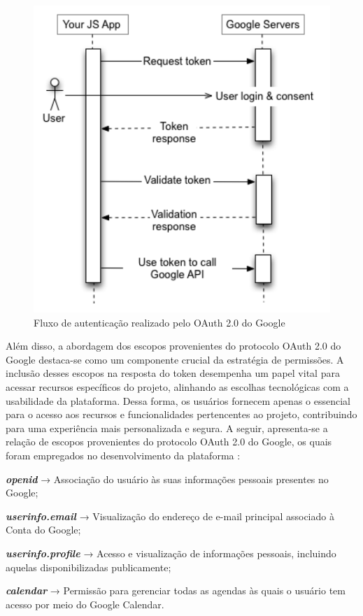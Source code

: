 \begin{figure}[!h] %
    \centering
    \includegraphics[scale=0.5]{latex/figuras/oauth.pdf}
    \caption[A implementação da autenticação OAuth 2.0]
    {Fluxo de autenticação realizado pelo OAuth 2.0 do Google}
\end{figure}

\pagebreak Além disso, a abordagem dos escopos provenientes do protocolo OAuth 2.0 do Google destaca-se como um componente crucial da estratégia de permissões. A inclusão desses escopos na resposta do token desempenha um papel vital para acessar recursos específicos do projeto, alinhando as escolhas tecnológicas com a usabilidade da plataforma. Dessa forma, os usuários fornecem apenas o essencial para o acesso aos recursos e funcionalidades pertencentes ao projeto, contribuindo para uma experiência mais personalizada e segura. A seguir, apresenta-se a relação de escopos provenientes do protocolo OAuth 2.0 do Google, os quais foram empregados no desenvolvimento da plataforma \cite{OAUTHSCOPES}:

\item \textit{\textbf{openid}} → Associação do usuário às suas informações pessoais presentes no Google;
\item \textit{\textbf{userinfo.email}} → Visualização do endereço de e-mail principal associado à Conta do Google;
\item \textit{\textbf{userinfo.profile}} → Acesso e visualização de informações pessoais, incluindo aquelas disponibilizadas publicamente;
\item \textit{\textbf{calendar}} → Permissão para gerenciar todas as agendas às quais o usuário tem acesso por meio do Google Calendar.

